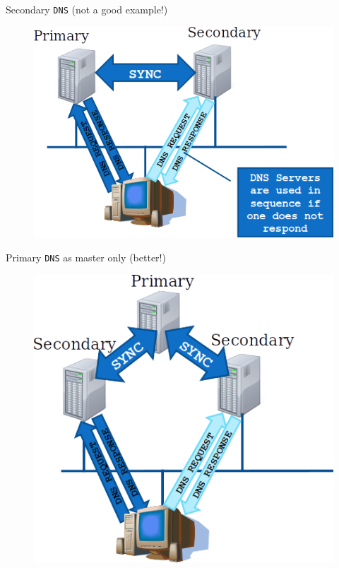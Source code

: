 \documentclass{beamer}
\begin{document}
\begin{frame}{Secondary \texttt{DNS} (not a good example!)}
  \begin{figure}
    \begin{center}
      \includegraphics[width=0.9\linewidth]{secondarydns.png}
    \end{center}
  \end{figure}
\end{frame}

\begin{frame}{Primary \texttt{DNS} as master only (better!)}
  \begin{figure}
    \begin{center}
      \includegraphics[width=0.65\linewidth]{masteronlydns.png}
    \end{center}
  \end{figure}
\end{frame}
\end{document}

